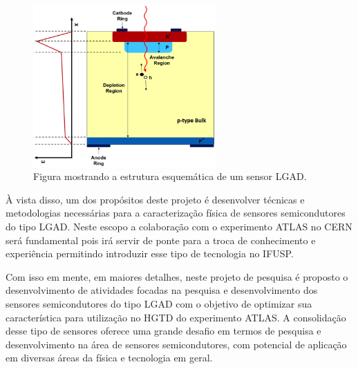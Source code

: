 \begin{figure}
    \centering
    \includegraphics[width=7.0cm]{assets/lgad.png}
    \caption{Figura mostrando a estrutura esquemática de um sensor LGAD.}
    \label{lgad}
\end{figure}

À vista disso, um dos propósitos deste projeto é desenvolver técnicas e metodologias necessárias para a caracterização física de sensores semicondutores do tipo LGAD. Neste escopo a colaboração com o experimento ATLAS no CERN será fundamental pois irá servir de ponte para a troca de conhecimento e experiência permitindo introduzir esse tipo de tecnologia no IFUSP.

Com isso em mente, em maiores detalhes, neste projeto de pesquisa é proposto o desenvolvimento de atividades focadas na pesquisa e desenvolvimento dos sensores semicondutores do tipo LGAD com o objetivo de optimizar sua característica para utilização no HGTD do experimento ATLAS. A consolidação desse tipo de sensores oferece uma grande desafio em termos de pesquisa e desenvolvimento na área de sensores semicondutores, com potencial de aplicação em diversas áreas da física e tecnologia em geral. 

